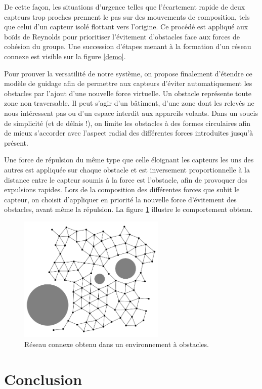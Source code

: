 \documentclass[10pt]{article}
\begin{document}
\begin{multicols}{2}
De cette façon, les situations d'urgence telles que l'écartement
rapide de deux capteurs trop proches prennent le pas sur des
mouvements de composition, tels que celui d'un capteur isolé flottant
vers l'origine. Ce procédé est appliqué aux boïds de Reynolds pour
prioritiser l'évitement d'obstacles face aux forces de cohésion du
groupe. Une succession d'étapes menant à la formation d'un réseau
connexe est visible sur la figure \ref{demo}.

Pour prouver la versatilité de notre système, on propose finalement
d'étendre ce modèle de guidage afin de permettre aux capteurs d'éviter
automatiquement les obstacles par l'ajout d'une nouvelle force
virtuelle. Un obstacle représente toute zone non traversable. Il peut
s'agir d'un bâtiment, d'une zone dont les relevés ne nous intéressent
pas ou d'un espace interdit aux appareils volants. Dans un soucis de
simplicité (et de délais !), on limite les obstacles à des formes
circulaires afin de mieux s'accorder avec l'aspect radial des
différentes forces introduites jusqu'à présent.

Une force de répulsion du même type que celle éloignant les capteurs
les uns des autres est appliquée sur chaque obstacle et est
inversement proportionnelle à la distance entre le capteur soumis à la
force est l'obstacle, afin de provoquer des expulsions rapides. Lors de
la composition des différentes forces que subit le capteur, on choisit
d'appliquer en priorité la nouvelle force d'évitement des obstacles,
avant même la répulsion. La figure \ref{obstacles} illustre le
comportement obtenu.

\begin{figure}[H]

  \centering

  \includegraphics[width=7cm]{obstacles.png}

  \caption{Réseau connexe obtenu dans un environnement à obstacles.}
  \label{obstacles}

\end{figure}

\section*{Conclusion}

\end{multicols}
\end{document}
